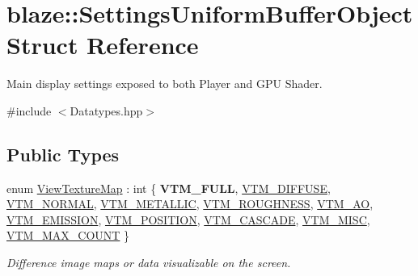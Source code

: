 \hypertarget{structblaze_1_1SettingsUniformBufferObject}{}\section{blaze\+:\+:Settings\+Uniform\+Buffer\+Object Struct Reference}
\label{structblaze_1_1SettingsUniformBufferObject}


Main display settings exposed to both Player and G\+PU Shader.  




{\ttfamily \#include $<$Datatypes.\+hpp$>$}

\subsection*{Public Types}
\begin{DoxyCompactItemize}
\item 
enum \hyperlink{structblaze_1_1SettingsUniformBufferObject_a713e01d20c85cc832626133616f90843}{View\+Texture\+Map} \+: int \{ \newline
{\bfseries V\+T\+M\+\_\+\+F\+U\+LL}, 
\hyperlink{structblaze_1_1SettingsUniformBufferObject_a713e01d20c85cc832626133616f90843aaaa6f94a4d863e9de5f682c40da273aa}{V\+T\+M\+\_\+\+D\+I\+F\+F\+U\+SE}, 
\hyperlink{structblaze_1_1SettingsUniformBufferObject_a713e01d20c85cc832626133616f90843aef7f7c0b1d8c260052402b6fc645dc13}{V\+T\+M\+\_\+\+N\+O\+R\+M\+AL}, 
\hyperlink{structblaze_1_1SettingsUniformBufferObject_a713e01d20c85cc832626133616f90843ae17e69b575740ae366d7d7d9ede72389}{V\+T\+M\+\_\+\+M\+E\+T\+A\+L\+L\+IC}, 
\newline
\hyperlink{structblaze_1_1SettingsUniformBufferObject_a713e01d20c85cc832626133616f90843a4b33d200fa3f026cf9b7523ab344f11f}{V\+T\+M\+\_\+\+R\+O\+U\+G\+H\+N\+E\+SS}, 
\hyperlink{structblaze_1_1SettingsUniformBufferObject_a713e01d20c85cc832626133616f90843a2a575aa305d67ebf6775c3de1a9670aa}{V\+T\+M\+\_\+\+AO}, 
\hyperlink{structblaze_1_1SettingsUniformBufferObject_a713e01d20c85cc832626133616f90843a9cc898d90d6c836afd06610315c4be20}{V\+T\+M\+\_\+\+E\+M\+I\+S\+S\+I\+ON}, 
\hyperlink{structblaze_1_1SettingsUniformBufferObject_a713e01d20c85cc832626133616f90843a2bb0a431eff8edca11dee3963c735caa}{V\+T\+M\+\_\+\+P\+O\+S\+I\+T\+I\+ON}, 
\newline
\hyperlink{structblaze_1_1SettingsUniformBufferObject_a713e01d20c85cc832626133616f90843aef81754a4152358c65c3cb00b098f104}{V\+T\+M\+\_\+\+C\+A\+S\+C\+A\+DE}, 
\hyperlink{structblaze_1_1SettingsUniformBufferObject_a713e01d20c85cc832626133616f90843af6f6aa0d787d165d86dcd1cc27a2f578}{V\+T\+M\+\_\+\+M\+I\+SC}, 
\hyperlink{structblaze_1_1SettingsUniformBufferObject_a713e01d20c85cc832626133616f90843a7c990685b32906338c76812186253dec}{V\+T\+M\+\_\+\+M\+A\+X\+\_\+\+C\+O\+U\+NT}
 \}\begin{DoxyCompactList}\small\item\em Difference image maps or data visualizable on the screen. \end{DoxyCompactList}
\end{DoxyCompactItemize}
